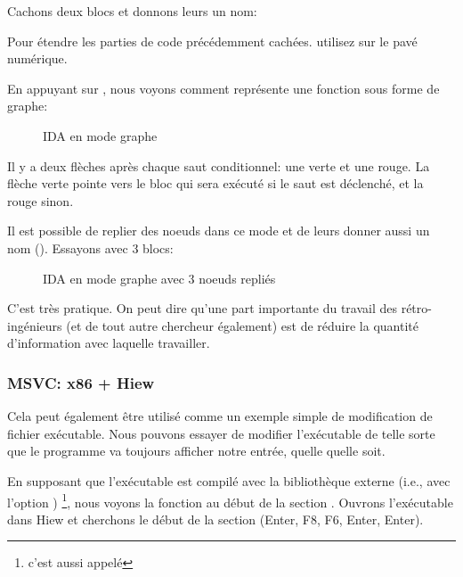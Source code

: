 Cachons deux blocs et donnons leurs un nom:



Pour étendre les parties de code précédemment cachées. utilisez \q{+} sur le
pavé numérique.

\clearpage
En appuyant sur , nous voyons comment \IDA représente une fonction sous
forme de graphe:

\begin{figure}[H]
\centering
{}
\caption{IDA en mode graphe}
\label{fig:ex3_IDA_1}
\end{figure}

Il y a deux flèches après chaque saut conditionnel: une verte et une rouge.
La flèche verte pointe vers le bloc qui sera exécuté si le saut est déclenché,
et la rouge sinon.

\clearpage
Il est possible de replier des noeuds dans ce mode et de leurs donner aussi un nom ().
Essayons avec 3 blocs:

\begin{figure}[H]
\centering
{}
\caption{IDA en mode graphe avec 3 noeuds repliés}
\label{fig:ex3_IDA_2}
\end{figure}

C'est très pratique.
On peut dire qu'une part importante du travail des rétro-ingénieurs (et de tout
autre chercheur également) est de réduire la quantité d'information avec laquelle
travailler.



\clearpage
\subsubsection{MSVC: x86 + Hiew}

Cela peut également être utilisé comme un exemple simple de modification de fichier
exécutable.
Nous pouvons essayer de modifier l'exécutable de telle sorte que le programme va
toujours afficher notre entrée, quelle quelle soit.

En supposant que l'exécutable est compilé avec la bibliothèque externe 
(i.e., avec l'option ) \footnote{c'est aussi appelé },
nous voyons la fonction \main au début de la section .
Ouvrons l'exécutable dans Hiew et cherchons le début de la section  (Enter,
F8, F6, Enter, Enter).

